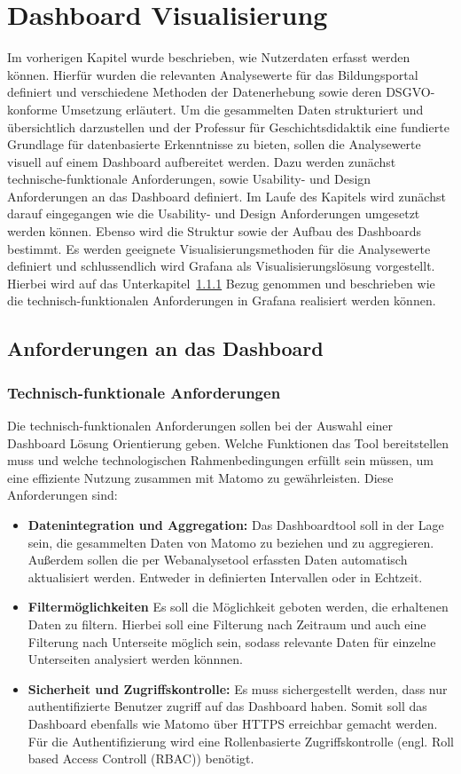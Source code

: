 \chapter{Dashboard Visualisierung} %
\label{ch:auswahl}
Im vorherigen Kapitel wurde beschrieben, wie Nutzerdaten erfasst werden können. Hierfür wurden die relevanten Analysewerte für das Bildungsportal definiert und verschiedene Methoden der Datenerhebung sowie deren DSGVO-konforme Umsetzung erläutert. Um die gesammelten Daten strukturiert und übersichtlich darzustellen und der Professur für Geschichtsdidaktik eine fundierte Grundlage für datenbasierte Erkenntnisse zu bieten, sollen die Analysewerte visuell auf einem Dashboard aufbereitet werden. Dazu werden zunächst technische-funktionale Anforderungen, sowie Usability- und Design Anforderungen an das Dashboard definiert. Im Laufe des Kapitels wird zunächst darauf eingegangen wie die Usability- und Design Anforderungen umgesetzt werden können. Ebenso wird die Struktur sowie der Aufbau des Dashboards bestimmt. Es werden geeignete Visualisierungsmethoden für die Analysewerte definiert und schlussendlich wird Grafana als Visualisierungslösung vorgestellt. Hierbei wird auf das Unterkapitel~\ref{sssec:technfunk} Bezug genommen und beschrieben wie die technisch-funktionalen Anforderungen in Grafana realisiert werden können.

\section{Anforderungen an das Dashboard}
\label{sec:anforderungen}
\subsection{Technisch-funktionale Anforderungen}
\label{sssec:technfunk}
Die technisch-funktionalen Anforderungen sollen bei der Auswahl einer Dashboard Lösung Orientierung geben. Welche Funktionen das Tool bereitstellen muss und welche technologischen Rahmenbedingungen erfüllt sein müssen, um eine effiziente Nutzung zusammen mit Matomo zu gewährleisten. Diese Anforderungen sind: 
\begin{itemize}
    \item \textbf{Datenintegration und Aggregation:} Das Dashboardtool soll in der Lage sein, die gesammelten Daten von Matomo zu beziehen und zu aggregieren. Außerdem sollen die per Webanalysetool erfassten Daten automatisch aktualisiert werden. Entweder in definierten Intervallen oder in Echtzeit.
    \item \textbf{Filtermöglichkeiten} Es soll die Möglichkeit geboten werden, die erhaltenen Daten zu filtern. Hierbei soll eine Filterung nach Zeitraum und auch eine Filterung nach Unterseite möglich sein, sodass relevante Daten für einzelne Unterseiten analysiert werden könnnen. 
    \item \textbf{Sicherheit und Zugriffskontrolle:} Es muss sichergestellt werden, dass nur authentifizierte Benutzer zugriff auf das Dashboard haben. Somit soll das Dashboard ebenfalls wie Matomo über HTTPS erreichbar gemacht werden. Für die Authentifizierung wird eine Rollenbasierte Zugriffskontrolle (engl. Roll based Access Controll (RBAC)) benötigt.
\end{itemize}

